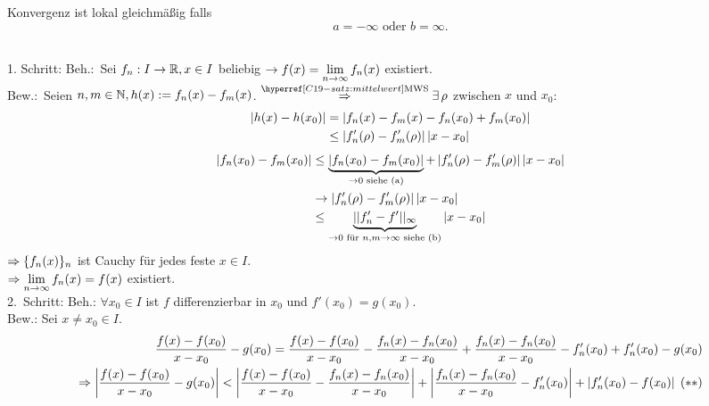 \documentclass[../ana1.tex]{subfiles}
\begin{document}
\begin{bem}
    Konvergenz ist lokal gleichmäßig falls 
    \[ a = -\infty \text{ oder } b = \infty. \]
\end{bem}
\begin{bew}\hfill \\
    1. Schritt: Beh.:\ Sei \( f_n: I \rightarrow \mathbb{R}, x\in I \) 
    beliebig \( \rightarrow f(x) = \lim\limits_{n\rightarrow\infty} f_n(x) \) existiert. \\
    Bew.:\ Seien \( n,m \in \mathbb{N}, h(x) := f_n(x) - f_m(x) \).
    \( \overref{C19-satz:mittelwert}{MWS}{\Rightarrow} 
    \exists \, \rho \) zwischen \(x\) und \(x_0\):
    \begin{align*}
        \left| h(x) - h(x_0) \right| 
        &= \left| f_n(x) - f_m(x) - f_n(x_0) + f_m(x_0) \right| \\
        &\leq \left| f_n'(\rho) - f_m'(\rho) \right|\left|x-x_0\right|
    \end{align*}
    \begin{align*}
        \left| f_n(x_0) - f_m(x_0) \right|
        &\leq 
        \underbrace{\left| f_n(x_0) - f_m(x_0) \right|}_{\rightarrow 0 \text{ siehe (a)}} 
        + \left| f_n'(\rho) 
        - f_m'(\rho) \right|\left|x-x_0\right| \\
        &\rightarrow \left| f_n'(\rho) - f_m'(\rho) \right| \left|x-x_0\right| \\
        &\leq \underbrace{||f_n' - f'||_\infty}_{\rightarrow 0 
        \text{ für } n,m \rightarrow \infty \text{ siehe (b)}} 
        \left|x-x_0\right|        
    \end{align*}
    \( \Rightarrow \{f_n(x)\}_n \) ist Cauchy für jedes feste 
    \( x\in I \). \\
    \( \Rightarrow \lim\limits_{n\rightarrow\infty} f_n(x) = f(x) \) existiert. \\
    2.\ Schritt: Beh.: \( \forall x_0 \in I \) ist \( f \) 
    differenzierbar in \(x_0\) und \( f'(x_0) = g(x_0) \). \\
    Bew.: Sei \(x \neq x_0 \in I\).
    \begin{align*}
        \frac{f(x) - f(x_0)}{x-x_0} - g(x_0) 
        = \frac{ f(x) - f(x_0) }{ x-x_0 } 
        - \frac{ f_n(x) - f_n(x_0) }{ x-x_0 } 
        + \frac{ f_n(x) - f_n(x_0) }{ x-x_0 } 
        - f_n'(x_0) + f_n'(x_0) - g(x_0)\\
        \Rightarrow \left|\frac{f(x)-f(x_0)}{x-x_0} -g(x_0)\right|
        < \left|\frac{f(x)-f(x_0)}{x-x_0} - \frac{f_n(x)-f_n(x_0)}{x-x_0}\right|
        + \left|\frac{f_n(x)-f_n(x_0)}{x-x_0}-f_n'(x_0)\right|
        + \left|f_n'(x_0)-f(x_0)\right| \; (**)
    \end{align*}
\end{bew}
\end{document}

